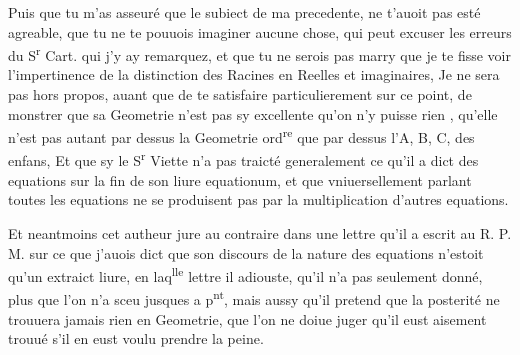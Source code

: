 \documentclass[11pt,a4paper]{article}
\begin{document}
Puis que tu m'as asseuré que le subiect de ma precedente, ne t'auoit pas esté agreable, que tu ne te pouuois imaginer aucune chose, qui peut excuser les erreurs du S\textsuperscript{r} Cart. qui j'y ay remarquez, et que tu ne serois pas marry que je te fisse voir l'impertinence de la distinction des Racines en Reelles et imaginaires, Je \struck{\ill{}} ne sera pas hors propos, auant que de te satisfaire particulierement sur ce point, de monstrer que sa Geometrie n'est pas sy excellente qu'on n'y puisse rien , qu'elle n'est pas autant par dessus la Geometrie ord\textsuperscript{re} que  par dessus l'A, B, C, des enfans, Et que sy le S\textsuperscript{r} Viette n'a pas traicté generalement ce qu'il a dict des equations sur la fin de son liure   equationum,  et que vniuersellement parlant toutes les equations ne se produisent pas par la multiplication d'autres equations.

Et neantmoins  cet autheur jure au contraire dans une lettre qu'il a escrit au R. P. M. sur ce que  j'auois dict que son discours de la nature des equations n'estoit qu'un extraict  liure, en laq\textsuperscript{lle} lettre il adiouste, qu'il n'a pas seulement donné, plus que l'on n'a sceu jusques a p\textsuperscript{nt}, mais aussy qu'il pretend que la posterité ne trouuera jamais rien en Geometrie, que l'on ne doiue juger qu'il  eust aisement trouué s'il en eust voulu prendre la peine.
\end{document}
